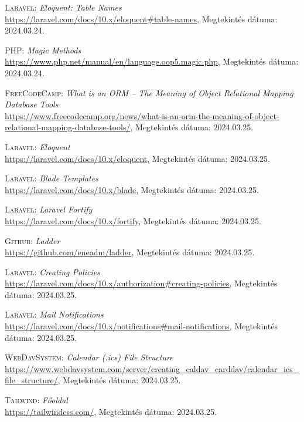 \documentclass[
]{thesis-ekf}
\theoremstyle{definition}
\theoremstyle{remark}
\begin{document}
\begin{thebibliography}{47}
\textsc{Laravel}: \emph{Eloquent: Table Names}
\\
\url{https://laravel.com/docs/10.x/eloquent#table-names}, Megtekintés dátuma: 2024.03.24.

\textsc{PHP}: \emph{Magic Methods}
\\
\url{https://www.php.net/manual/en/language.oop5.magic.php}, Megtekintés dátuma: 2024.03.24.

\textsc{FreeCodeCamp}: \emph{What is an ORM – The Meaning of Object Relational Mapping Database Tools}
\\
\url{https://www.freecodecamp.org/news/what-is-an-orm-the-meaning-of-object-relational-mapping-database-tools/}, Megtekintés dátuma: 2024.03.25.

\textsc{Laravel}: \emph{Eloquent}
\\
\url{https://laravel.com/docs/10.x/eloquent}, Megtekintés dátuma: 2024.03.25.

\textsc{Laravel}: \emph{Blade Templates}
\\
\url{https://laravel.com/docs/10.x/blade}, Megtekintés dátuma: 2024.03.25.

\textsc{Laravel}: \emph{Laravel Fortify}
\\
\url{https://laravel.com/docs/10.x/fortify}, Megtekintés dátuma: 2024.03.25.

\textsc{Github}: \emph{Ladder}
\\
\url{https://github.com/eneadm/ladder}, Megtekintés dátuma: 2024.03.25.

\textsc{Laravel}: \emph{Creating Policies}
\\
\url{https://laravel.com/docs/10.x/authorization#creating-policies}, Megtekintés dátuma: 2024.03.25.

\textsc{Laravel}: \emph{Mail Notifications}
\\
\url{https://laravel.com/docs/10.x/notifications#mail-notifications}, Megtekintés dátuma: 2024.03.25.

\textsc{WebDavSystem}: \emph{Calendar (.ics) File Structure}
\\
\url{https://www.webdavsystem.com/server/creating_caldav_carddav/calendar_ics_file_structure/}, Megtekintés dátuma: 2024.03.25.

\textsc{Tailwind}: \emph{Főoldal}
\\
\url{https://tailwindcss.com/}, Megtekintés dátuma: 2024.03.25.


\end{thebibliography}
\end{document}
